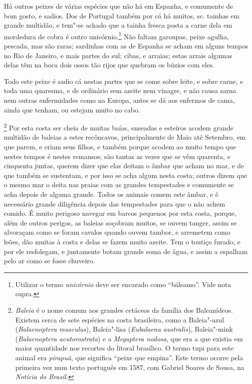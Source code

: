 \begin{linenumbers}
 Há outros peixes de várias espécies que não há em Espanha, e comumente
de bom gosto, e sadios. Dos de Portugal também por cá há muitos, sc.
tainhas em grande multidão, e tem"-se achado que a tainha fresca posta a
carne dela em mordedura de cobra é outro unicórnio.\footnote{ Utilizar 
o termo \textit{unicórnio} deve ser encarado como
``bálsamo''. Vide nota supra.} Não faltam garoupas, peixe agulha,
pescada, mas são raras; sardinhas com as de Espanha se acham em alguns
tempos no Rio de Janeiro, e mais partes do sul; cibas, e arraias; estas
arrais algumas delas têm na boca dois ossos tão rijos que quebram os búzios com eles. 

 Todo este peixe é sadio cá nestas partes que se come sobre leite, e
sobre carne, e toda uma quaresma, e de ordinário sem azeite nem
vinagre, e não causa sarna nem outras enfermidades como na Europa,
antes se dá aos enfermos de cama, ainda que tenham, ou estejam muito no cabo.

\footnote{ \textit{Baleia} é o nome comum aos grandes
cetáceos da família dos Baleanídeos. Existem cerca de sete espécies na
costa brasileira, como a Baleia"-azul (\textit{Balaenoptera musculus}), 
Baleia"-lisa (\textit{Eubalaena australis}), Baleia"-mink 
(\textit{Balaenoptera acutorostrata}) e a \textit{Megaptera nodosa}, 
que era a que existia em maior quantidade nos recortes do litoral
brasílico. O termo tupi para este animal era \textit{pirapuã}, que
significa ``peixe que empina''. Este termo ocorre pela primeira vez num
texto português em 1587, com Gabriel Soares de Sousa, na
\textit{Notícia do Brasil.}} Por esta costa ser cheia de
muitas baías, enseadas e esteiros acodem grande multidão de baleias a
estes recôncavos, principalmente de Maio até Setembro, em que parem, e
criam seus filhos, e também porque acodem ao muito tempo que nestes
tempos é nestes remansos; são tantas as vezes que se vêm quarenta, e
cinquenta juntas, querem dizer que elas deitam o âmbar que acham no
mar, e de que também se sustentam, e por isso se acha algum nesta
costa; outros dizem que o mesmo mar o deita nas praias com as grandes
tempestades e comumente se acha depois de alguma grande. Todos os
animais comem este âmbar, e é necessário grande diligência depois das
tempestades para que o não achem comido. É muito perigoso navegar em
barcos pequenos por esta costa, porque, além de outros perigos, as
baleias soçobram muitos, se ouvem tanger, assim se alvoraçam como se
foram cavalos quando ouvem tambor, e arremetem como leões, dão muitas à
costa e delas se fazem muito azeite. Tem o toutiço furado, e por ele
resfolegam, e juntamente botam grande soma de água, e assim a espalham
pelo ar como se fosse chuveiro.


\end{linenumbers}
